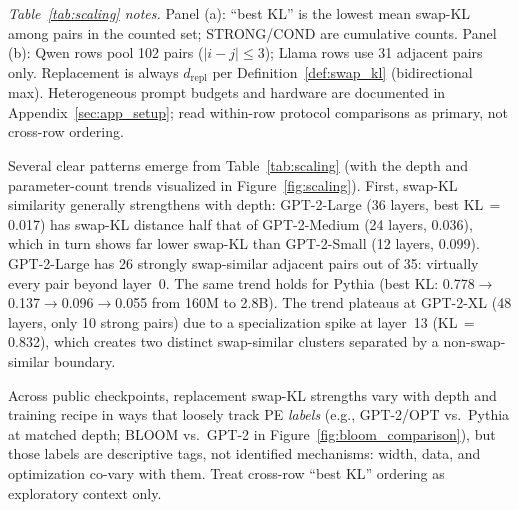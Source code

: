 \documentclass{article}
\begin{document}
\noindent\textit{Table~\ref{tab:scaling} notes.} Panel (a): ``best KL'' is the lowest mean swap-KL among pairs in the counted set; STRONG/COND are cumulative counts. Panel (b): Qwen rows pool 102 pairs ($|i{-}j|{\leq}3$); Llama rows use 31 adjacent pairs only. Replacement is always $d_{\text{repl}}$ per Definition~\ref{def:swap_kl} (bidirectional max). Heterogeneous prompt budgets and hardware are documented in Appendix~\ref{sec:app_setup}; read within-row protocol comparisons as primary, not cross-row ordering.

Several clear patterns emerge from Table~\ref{tab:scaling} (with the depth and parameter-count trends visualized in Figure~\ref{fig:scaling}). First, swap-KL similarity generally strengthens with depth: GPT-2-Large (36 layers, best KL\,$=$\,0.017) has swap-KL distance half that of GPT-2-Medium (24 layers, 0.036), which in turn shows far lower swap-KL than GPT-2-Small (12 layers, 0.099). GPT-2-Large has 26 strongly swap-similar adjacent pairs out of 35: virtually every pair beyond layer~0. The same trend holds for Pythia (best KL: 0.778$\to$0.137$\to$0.096$\to$0.055 from 160M to 2.8B). The trend plateaus at GPT-2-XL (48 layers, only 10 strong pairs) due to a specialization spike at layer~13 (KL\,$=$\,0.832), which creates two distinct swap-similar clusters separated by a non-swap-similar boundary.

Across public checkpoints, replacement swap-KL strengths vary with depth and training recipe in ways that loosely track PE \emph{labels} (e.g., GPT-2/OPT vs.\ Pythia at matched depth; BLOOM vs.\ GPT-2 in Figure~\ref{fig:bloom_comparison}), but those labels are descriptive tags, not identified mechanisms: width, data, and optimization co-vary with them. Treat cross-row ``best KL'' ordering as exploratory context only.
\end{document}
